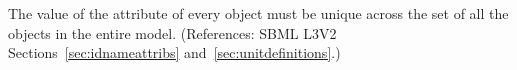 The value of the attribute  of every \UnitDefinition object must
be unique across the set of all the \UnitDefinition objects in the entire
model.  (References: SBML L3V2 Sections~\ref{sec:idnameattribs}
and~\ref{sec:unitdefinitions}.)
